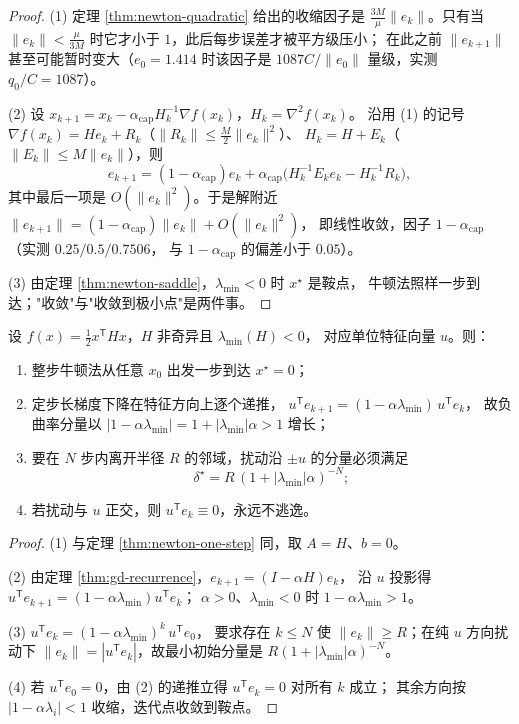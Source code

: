\begin{proof}
(1) 定理 \ref{thm:newton-quadratic} 给出的收缩因子是
$\frac{3M}{\mu}\|e_k\|$。只有当
$\|e_k\|<\frac{\mu}{3M}$ 时它才小于 $1$，此后每步误差才被平方级压小；
在此之前 $\|e_{k+1}\|$ 甚至可能暂时变大（$e_0=1.414$ 时该因子是 $1087C/\|e_0\|$
量级，实测 $q_0/C=1087$）。

(2) 设 $x_{k+1}=x_k-\alpha_{\text{cap}}H_k^{-1}\nabla f(x_k)$，$H_k=\nabla^2f(x_k)$。
沿用 (1) 的记号 $\nabla f(x_k)=He_k+R_k$（$\|R_k\|\le\frac M2\|e_k\|^2$）、
$H_k=H+E_k$（$\|E_k\|\le M\|e_k\|$），则
\[
  e_{k+1}=(1-\alpha_{\text{cap}})e_k
  +\alpha_{\text{cap}}\bigl(H_k^{-1}E_k e_k-H_k^{-1}R_k\bigr),
\]
其中最后一项是 $O(\|e_k\|^2)$。于是解附近
$\|e_{k+1}\|=(1-\alpha_{\text{cap}})\|e_k\|+O(\|e_k\|^2)$，
即线性收敛，因子 $1-\alpha_{\text{cap}}$（实测 $0.25/0.5/0.7506$，
与 $1-\alpha_{\text{cap}}$ 的偏差小于 $0.05$）。

(3) 由定理 \ref{thm:newton-saddle}，$\lambda_{\min}<0$ 时 $x^\star$ 是鞍点，
牛顿法照样一步到达；"收敛"与"收敛到极小点"是两件事。
\end{proof}

\begin{theorem}[牛顿法不检查曲率符号：鞍点]
\label{thm:newton-saddle}
设 $f(x)=\tfrac12x^{\mathsf T}Hx$，$H$ 非奇异且 $\lambda_{\min}(H)<0$，
对应单位特征向量 $u$。则：
\begin{enumerate}
  \item 整步牛顿法从任意 $x_0$ 出发一步到达 $x^\star=0$；
  \item 定步长梯度下降在特征方向上逐个递推，
        $u^{\mathsf T}e_{k+1}=(1-\alpha\lambda_{\min})\,u^{\mathsf T}e_k$，
        故负曲率分量以 $|1-\alpha\lambda_{\min}|=1+|\lambda_{\min}|\alpha>1$ 增长；
  \item 要在 $N$ 步内离开半径 $R$ 的邻域，扰动沿 $\pm u$ 的分量必须满足
        \[
          \delta^\star=R\,(1+|\lambda_{\min}|\alpha)^{-N};
        \]
  \item 若扰动与 $u$ 正交，则 $u^{\mathsf T}e_k\equiv0$，永远不逃逸。
\end{enumerate}
\end{theorem}

\begin{proof}
(1) 与定理 \ref{thm:newton-one-step} 同，取 $A=H$、$b=0$。

(2) 由定理 \ref{thm:gd-recurrence}，$e_{k+1}=(I-\alpha H)e_k$，
沿 $u$ 投影得 $u^{\mathsf T}e_{k+1}=(1-\alpha\lambda_{\min})u^{\mathsf T}e_k$；
$\alpha>0$、$\lambda_{\min}<0$ 时 $1-\alpha\lambda_{\min}>1$。

(3) $u^{\mathsf T}e_k=(1-\alpha\lambda_{\min})^k\,u^{\mathsf T}e_0$，
要求存在 $k\le N$ 使 $\|e_k\|\ge R$；在纯 $u$ 方向扰动下
$\|e_k\|=|u^{\mathsf T}e_k|$，故最小初始分量是 $R(1+|\lambda_{\min}|\alpha)^{-N}$。

(4) 若 $u^{\mathsf T}e_0=0$，由 (2) 的递推立得 $u^{\mathsf T}e_k=0$ 对所有 $k$ 成立；
其余方向按 $|1-\alpha\lambda_i|<1$ 收缩，迭代点收敛到鞍点。
\end{proof}

